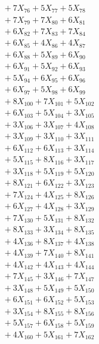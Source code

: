 \documentclass[a4paper,10pt]{article}
\begin{document}
{\begin{align}
&\;  + 7 X_{76} + 5 X_{77} + 5 X_{78} \\[0.3ex]
&\;  + 7 X_{79} + 7 X_{80} + 6 X_{81} \\[0.3ex]
&\;  + 6 X_{82} + 7 X_{83} + 7 X_{84} \\[0.3ex]
&\;  + 6 X_{85} + 4 X_{86} + 4 X_{87} \\[0.3ex]
&\;  + 6 X_{88} + 5 X_{89} + 6 X_{90} \\[0.3ex]
&\;  + 6 X_{91} + 5 X_{92} + 6 X_{93} \\[0.3ex]
&\;  + 5 X_{94} + 6 X_{95} + 6 X_{96} \\[0.3ex]
&\;  + 6 X_{97} + 5 X_{98} + 6 X_{99} \\[0.5ex]\allowbreak
&\;  + 8 X_{100} + 7 X_{101} + 5 X_{102} \\[0.3ex]
&\;  + 6 X_{103} + 5 X_{104} + 3 X_{105} \\[0.3ex]
&\;  + 3 X_{106} + 3 X_{107} + 4 X_{108} \\[0.3ex]
&\;  + 3 X_{109} + 3 X_{110} + 3 X_{111} \\[0.3ex]
&\;  + 6 X_{112} + 6 X_{113} + 3 X_{114} \\[0.3ex]
&\;  + 5 X_{115} + 8 X_{116} + 3 X_{117} \\[0.3ex]
&\;  + 3 X_{118} + 5 X_{119} + 5 X_{120} \\[0.3ex]
&\;  + 8 X_{121} + 6 X_{122} + 3 X_{123} \\[0.3ex]
&\;  + 7 X_{124} + 4 X_{125} + 8 X_{126} \\[0.3ex]
&\;  + 6 X_{127} + 4 X_{128} + 3 X_{129} \\[0.5ex]\allowbreak
&\;  + 7 X_{130} + 5 X_{131} + 8 X_{132} \\[0.3ex]
&\;  + 8 X_{133} + 3 X_{134} + 8 X_{135} \\[0.3ex]
&\;  + 4 X_{136} + 8 X_{137} + 4 X_{138} \\[0.3ex]
&\;  + 4 X_{139} + 7 X_{140} + 8 X_{141} \\[0.3ex]
&\;  + 4 X_{142} + 4 X_{143} + 4 X_{144} \\[0.3ex]
&\;  + 7 X_{145} + 3 X_{146} + 7 X_{147} \\[0.3ex]
&\;  + 3 X_{148} + 5 X_{149} + 5 X_{150} \\[0.3ex]
&\;  + 6 X_{151} + 6 X_{152} + 5 X_{153} \\[0.3ex]
&\;  + 3 X_{154} + 8 X_{155} + 8 X_{156} \\[0.3ex]
&\;  + 5 X_{157} + 6 X_{158} + 5 X_{159} \\[0.5ex]\allowbreak
&\;  + 4 X_{160} + 5 X_{161} + 7 X_{162} \\[0.3ex]

\end{align}}
\end{document}
